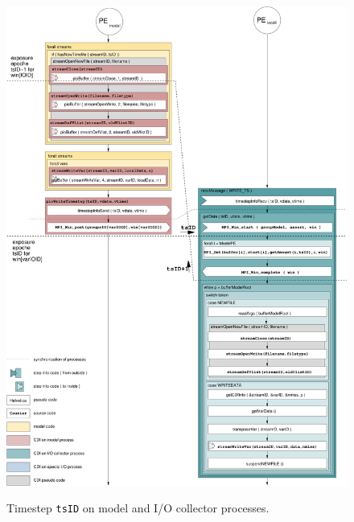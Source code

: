 \begin{figure}[H]
\centering
\includegraphics[scale=0.5]{../graphics/timestep.pdf}
\caption { Timestep {\tt tsID} on model and I/O collector processes.}
\label{timestep}
\end{figure}